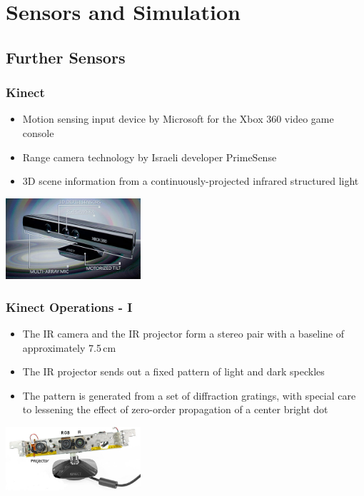 \section{Sensors and Simulation}
\subsection{Further Sensors}

\begin{frame} 
 \frametitle{Kinect}
\begin{itemize}
 \item Motion sensing input device by Microsoft for the Xbox 360 video game console
 \item Range camera technology by Israeli developer PrimeSense
 \item 3D scene information from a continuously-projected infrared structured light
\end{itemize}
\hspace{35ex}\includegraphics[width=5cm]{images/kinect.png}
\end{frame}

\begin{frame}
 \frametitle{Kinect Operations - I}

\begin{itemize}
  \item The IR camera and the IR projector form a stereo pair with a baseline of approximately 7.5\,cm
  \item The IR projector sends out a fixed pattern of light and dark speckles
  \item The pattern is generated from a set of diffraction gratings, with special care to lessening the effect of zero-order propagation of a center bright dot
\end{itemize}
\hspace{35ex}\includegraphics[width=5cm]{images/kinect2.png} 
\end{frame}

